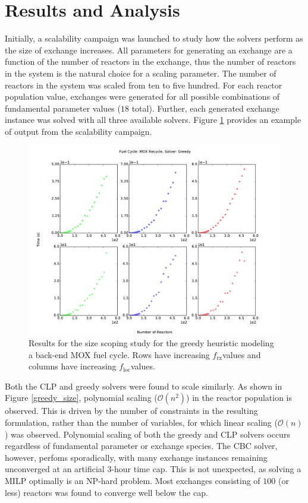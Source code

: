 \documentclass{anstrans}
\newcommand{\frx}{$f_{\text{rx}}$}
\newcommand{\floc}{$f_{\text{loc}}$}
\begin{document}
\section{Results and Analysis}

Initially, a scalability campaign was launched to study how the solvers perform
as the size of exchange increases. All parameters for generating an exchange are
a function of the number of reactors in the exchange, thus the number of
reactors in the system is the natural choice for a scaling parameter. The number
of reactors in the system was scaled from ten to five hundred. For each reactor
population value, exchanges were generated for all possible combinations of
fundamental parameter values ($18$ total). Further, each generated exchange
instance was solved with all three available solvers. Figure
\ref{fig:greedy_size} provides an example of output from the scalability
campaign.

\begin{figure}
  \begin{center}
    \includegraphics[width=1.5\columnwidth]{base_back_n_rxtr_time_fc1_solvergreedy.pdf}
    \caption[]{
      \label{fig:greedy_size}
      Results for the size scoping study for the greedy heuristic modeling a
      back-end MOX fuel cycle. Rows have increasing \frx values and columns have
      increasing \floc values.}
  \end{center}
\end{figure}

Both the CLP and greedy solvers were found to scale similarly. As shown in
Figure \ref{greedy_size}, polynomial scaling ($\mathcal{O}(n^2)$) in the reactor
population is observed. This is driven by the number of constraints in the
resulting formulation, rather than the number of variables, for which linear
scaling ($\mathcal{O}(n)$) was observed. Polynomial scaling of both the greedy
and CLP solvers occurs regardless of fundamental parameter or exchange
species. The CBC solver, however, perfoms sporadically, with many exchange
instances remaining unconverged at an artificial $3$-hour time cap. This is not
unexpected, as solving a MILP optimally is an NP-hard problem. Most exchanges
consisting of $100$ (or less) reactors was found to converge well below the cap.
\end{document}
